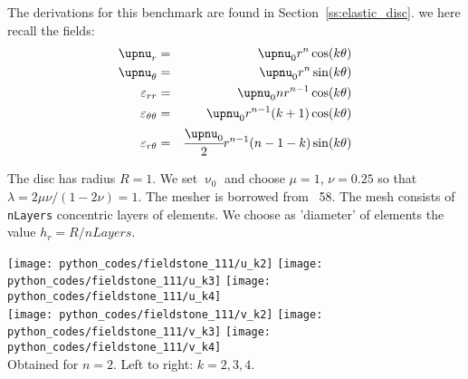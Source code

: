 

The derivations for this benchmark are found in Section~\ref{ss:elastic_disc}.
we here recall the fields:
\begin{eqnarray}
\upnu_r          &=& \upnu_0 r^n \cos (k \theta)   \\
\upnu_\theta     &=& \upnu_0 r^n \sin (k \theta)   \\
\varepsilon_{rr} &=&   \upnu_0 n r^{n-1} \cos (k\theta) \\
\varepsilon_{\theta\theta} &=&    \upnu_0 r^{n-1} (k+1) \cos (k\theta) \\
\varepsilon_{r\theta} &=&  \cfrac{\upnu_0}{2}  r^{n-1}  (n-1-k)  \sin (k \theta)  \\
\end{eqnarray}


The disc has radius $R=1$. We set $\upnu_0$ and choose $\mu=1$, $\nu=0.25$ so that 
$\lambda=2\mu\nu/(1-2\nu)=1$.
The mesher is borrowed from \stone~58. The mesh consists of {\tt nLayers} concentric layers of elements.
We choose as 'diameter' of elements the value $h_r=R/nLayers$.



\begin{center}
\texttt{[image: python\_codes/fieldstone\_111/u\_k2]}
\texttt{[image: python\_codes/fieldstone\_111/u\_k3]}
\texttt{[image: python\_codes/fieldstone\_111/u\_k4]}\\
\texttt{[image: python\_codes/fieldstone\_111/v\_k2]}
\texttt{[image: python\_codes/fieldstone\_111/v\_k3]}
\texttt{[image: python\_codes/fieldstone\_111/v\_k4]}\\
{\captionfont Obtained for $n=2$. Left to right: $k=2,3,4$.}
\end{center}

